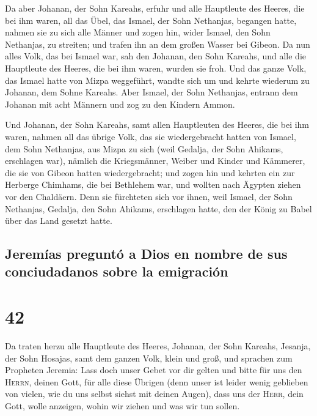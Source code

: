  Da aber Johanan, der Sohn Kareahs, erfuhr und alle
Hauptleute des Heeres, die bei ihm waren, all das Übel, das Ismael, der
Sohn Nethanjas, begangen hatte,  nahmen sie zu sich alle
Männer und zogen hin, wider Ismael, den Sohn Nethanjas, zu streiten; und
trafen ihn an dem großen Wasser bei Gibeon.  Da nun alles
Volk, das bei Ismael war, sah den Johanan, den Sohn Kareahs, und alle
die Hauptleute des Heeres, die bei ihm waren, wurden sie froh.
 Und das ganze Volk, das Ismael hatte von Mizpa
weggeführt, wandte sich um und kehrte wiederum zu Johanan, dem Sohne
Kareahs.  Aber Ismael, der Sohn Nethanjas, entrann dem
Johanan mit acht Männern und zog zu den Kindern Ammon.

 Und Johanan, der Sohn Kareahs, samt allen Hauptleuten
des Heeres, die bei ihm waren, nahmen all das übrige Volk, das sie
wiedergebracht hatten von Ismael, dem Sohn Nethanjas, aus Mizpa zu sich
(weil Gedalja, der Sohn Ahikams, erschlagen war), nämlich die
Kriegsmänner, Weiber und Kinder und Kämmerer, die sie von Gibeon hatten
wiedergebracht;  und zogen hin und kehrten ein zur
Herberge Chimhams, die bei Bethlehem war, und wollten nach Ägypten
ziehen vor den Chaldäern.  Denn sie fürchteten sich vor
ihnen, weil Ismael, der Sohn Nethanjas, Gedalja, den Sohn Ahikams,
erschlagen hatte, den der König zu Babel über das Land gesetzt hatte.

\hypertarget{jeremuxedas-preguntuxf3-a-dios-en-nombre-de-sus-conciudadanos-sobre-la-emigraciuxf3n}{%
\subsection{Jeremías preguntó a Dios en nombre de sus conciudadanos
sobre la
emigración}\label{jeremuxedas-preguntuxf3-a-dios-en-nombre-de-sus-conciudadanos-sobre-la-emigraciuxf3n}}

\hypertarget{section-41}{%
\section{42}\label{section-41}}

 Da traten herzu alle Hauptleute des Heeres, Johanan, der
Sohn Kareahs, Jesanja, der Sohn Hosajas, samt dem ganzen Volk, klein und
groß,  und sprachen zum Propheten Jeremia: Lass doch unser
Gebet vor dir gelten und bitte für uns den \textsc{Herrn}, deinen Gott,
für alle diese Übrigen (denn unser ist leider wenig geblieben von
vielen, wie du uns selbst siehst mit deinen Augen),  dass
uns der \textsc{Herr}, dein Gott, wolle anzeigen, wohin wir ziehen und
was wir tun sollen.

